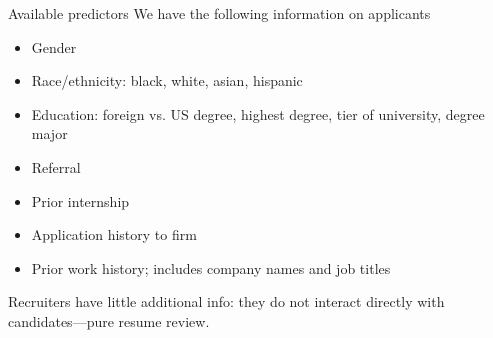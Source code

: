 \documentclass[aspectratio=169,t,11pt,table]{beamer}
\begin{document}

\begin{frame}{Available predictors} \small 
\alert{We have the following information on applicants}
\begin{itemize}
\item Gender
\item Race/ethnicity: black, white, asian, hispanic
\item Education: foreign vs. US degree, highest degree, tier of university, degree major
\item Referral
\item Prior internship 
\item Application history to firm
\item Prior work history; includes company names and job titles \medskip
\end{itemize}

\alert{Recruiters have little additional info:} they do not interact directly with candidates---pure resume review.

\end{frame}
\end{document}
